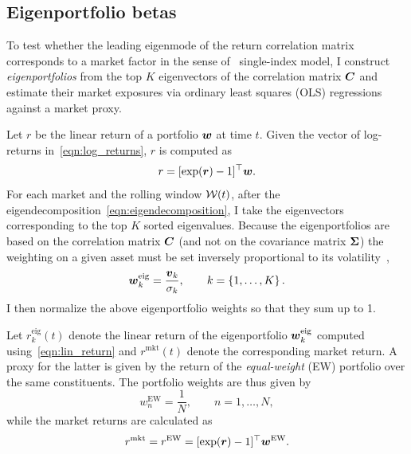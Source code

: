 \documentclass[pdflatex,sn-basic]{sn-jnl}%
\theoremstyle{thmstyleone}%
\theoremstyle{thmstyletwo}%
\theoremstyle{thmstylethree}%
\begin{document}
\subsection{Eigenportfolio betas}
\label{sec:eigenportfolio_betas}

To test whether the leading eigenmode of the return correlation matrix corresponds to a market factor in the sense of~\citet{sharpe1964capital} single-index model, I construct \emph{eigenportfolios} from the top $K$ eigenvectors of the correlation matrix $\boldsymbol{C}$ and estimate their market exposures via ordinary least squares (OLS) regressions against a market proxy.

Let $r$ be the linear return of a portfolio $\boldsymbol{w}$ at time $t$. Given the vector of log-returns in~\eqref{eqn:log_returns}, $r$ is computed as
\begin{equation}
\label{eqn:lin_return}
    r = [\exp(\boldsymbol{r})-1]^{\top} \boldsymbol{w}.
\end{equation}
For each market and the rolling window $\mathcal{W}(t)$, after the eigendecomposition~\eqref{eqn:eigendecomposition}, I take the eigenvectors corresponding to the top $K$ sorted eigenvalues. Because the eigenportfolios are based on the correlation matrix $\boldsymbol{C}$ (and not on the covariance matrix $\boldsymbol{\Sigma}$) the weighting on a given asset must be set inversely proportional to its volatility~\citep[see][]{avellaneda2010statistical}, 
\begin{equation}
\label{eqn:eigenportfolio}
    \boldsymbol{w}^{\textrm{eig}}_k = \frac{\boldsymbol{v}_k}{\sigma_k}, \qquad k = \left\{ 1, \ldots,K \right\}.
\end{equation}
I then normalize the above eigenportfolio weights so that they sum up to 1. 

Let $r^{\textrm{eig}}_k(t)$ denote the linear return of the eigenportfolio $\boldsymbol{w}^{\textrm{eig}}_k$ computed using~\eqref{eqn:lin_return} and $r^{\textrm{mkt}}(t)$ denote the corresponding market return. A proxy for the latter is given by the return of the \textit{equal-weight} (EW) portfolio over the same constituents. The portfolio weights are thus given by
\begin{equation}
\label{eqn:ew_portfolio}
    w^{\textrm{EW}}_n = \frac{1}{N}, \qquad n = 1,\dots,N,
\end{equation}
while the market returns are calculated as
\begin{equation}
\label{eqn:market_return}
    r^{\textrm{mkt}} = r^{\textrm{EW}} = [\exp(\boldsymbol{r})-1]^{\top} \boldsymbol{w}^{\textrm{EW}}.
\end{equation}
\end{document}
